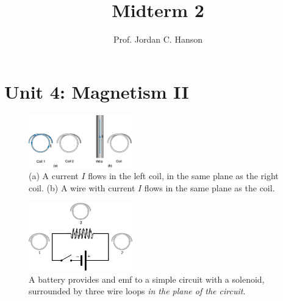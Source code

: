 \documentclass[12pt,twocolumn]{article}
\title{Midterm 2}
\author{Prof. Jordan C. Hanson}
\begin{document}
\maketitle
\small

\section{Unit 4: Magnetism II}

\begin{figure}
\centering
\includegraphics[width=0.4\textwidth]{B-flux.jpeg}
\caption{\label{fig:B-flux} \small (a) A current $I$ flows in the left coil, in the same plane as the right coil. (b) A wire with current $I$ flows in the same plane as the coil.}
\end{figure}
\begin{figure}
\centering
\includegraphics[width=0.4\textwidth]{awesome.jpeg}
\caption{\label{fig:B-flux2} \small A battery provides and emf to a simple circuit with a solenoid, surrounded by three wire loops \textit{in the plane of the circuit}.}
\end{figure}
\end{document}
